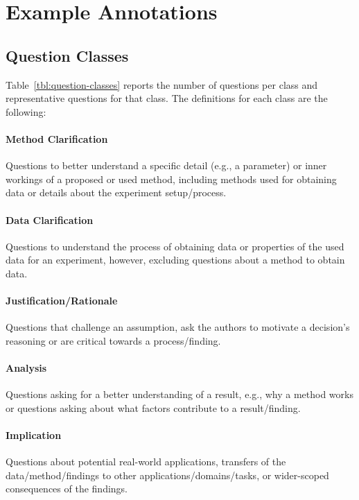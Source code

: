 

\clearpage

\section{Example Annotations}\label{sec:appendix-examplary-annotation}


\clearpage
\begin{multicols}{2}
\section{Question Classes}\label{sec:appendix-question-classes}
Table~\ref{tbl:question-classes} reports the number of questions per class and representative questions for that class. The definitions for each class are the following:
\paragraph{Method Clarification} Questions to better understand a specific detail (e.g., a parameter) or inner workings of a proposed or used method, including methods used for obtaining data or details about the experiment setup/process.
\paragraph{Data Clarification} Questions to understand the process of obtaining data or properties of the used data for an experiment, however, excluding questions about a method to obtain data.
\paragraph{Justification/Rationale} Questions that challenge an assumption, ask the authors to motivate a decision's reasoning or are critical towards a process/finding.
\paragraph{Analysis} Questions asking for a better understanding of a result, e.g., why a method works or questions asking about what factors contribute to a result/finding. 
\paragraph{Implication} Questions about potential real-world applications, transfers of the data/method/findings to other applications/domains/tasks, or wider-scoped consequences of the findings.

\end{multicols}
